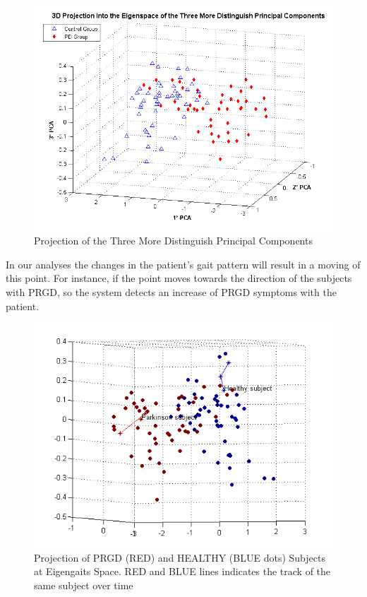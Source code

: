 \documentclass[10pt, conference, compsocconf]{IEEEtran}
\begin{document}
\begin{figure}
  \centering
  \includegraphics[scale=0.45]{./img/projection-eigenspace.png}
  \caption{Projection of the Three More Distinguish Principal Components}
  \label{fig:projecaopcaparkinson}
\end{figure}

In our analyses the changes in the patient's gait pattern will result in a moving of this point. For instance, if the point moves towards the direction of the subjects with PRGD, so the system detects an increase of PRGD symptoms with the patient.

\begin{figure}
  \centering
  \includegraphics[scale=0.6]{./img/pca-projection-health-parkinson.png}
  \caption{Projection of PRGD (RED) and HEALTHY (BLUE dots) Subjects at Eigengaits 
Space. RED and BLUE lines indicates the track of the same subject over time
}
  \label{fig:projecaopcaparkinson}
\end{figure}
\end{document}
